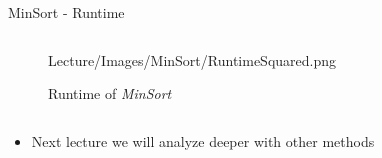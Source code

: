 \begin{frame}{MinSort - Runtime}
\begin{columns}
\begin{column}{0.5\textwidth}
\begin{center}
\begin{figure}
            {Lecture/Images/MinSort/RuntimeSquared.png}%
          \vspace*{-1.0em}\caption{Runtime of \textit{MinSort}}%
          \label{fig:minsort_runtime_2}%
        \end{figure}%
      \end{center}
    \end{column}%
  \end{columns}
  \begin{columns}
    \begin{column}{1.0\textwidth}
      \begin{itemize}
        \item
          Next lecture we will analyze deeper with other methods
      \end{itemize}
    \end{column}
    \begin{column}{0.0\textwidth}\end{column}
  \end{columns}
\end{frame}